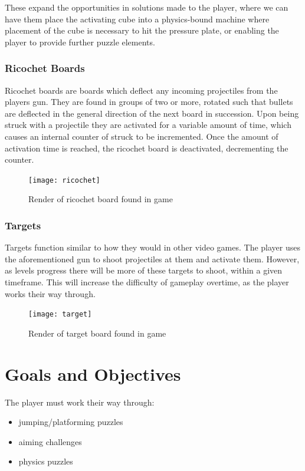 \documentclass[11pt]{article}
\begin{document}
These expand the opportunities in solutions made to the player, where we can have them place the activating cube into a physics-bound machine where placement of the cube is necessary to hit the pressure plate, or enabling the player to provide further puzzle elements.


\subsubsection*{Ricochet Boards}
Ricochet boards are boards which deflect any incoming projectiles from the players gun. They are found in groups of two or more, rotated such that bullets are deflected in the general direction of the next board in succession.
Upon being struck with a projectile they are activated for a variable amount of time, which causes an internal counter of struck to be incremented. Once the amount of activation time is reached, the ricochet board is deactivated, decrementing the counter. 
\begin{figure}[h]
\begin{center}
\texttt{[image: ricochet]}
\end{center}
\caption{Render of ricochet board found in game}
\end{figure}

\subsubsection*{Targets}
Targets function similar to how they would in other video games. The player uses the aforementioned gun to shoot projectiles at them and activate them. However, as levels progress there will be more of these targets to shoot, within a given timeframe. This will increase the difficulty of gameplay overtime, as the player works their way through.

\begin{figure}[h]
\begin{center}
\texttt{[image: target]}
\end{center}
\caption{Render of target board found in game}
\end{figure}



\newpage
\section*{Goals and Objectives}
The player must work their way through:

\begin{itemize}
	\item jumping/platforming puzzles
	\item aiming challenges 
	\item physics puzzles
\end{itemize}
\end{document}
